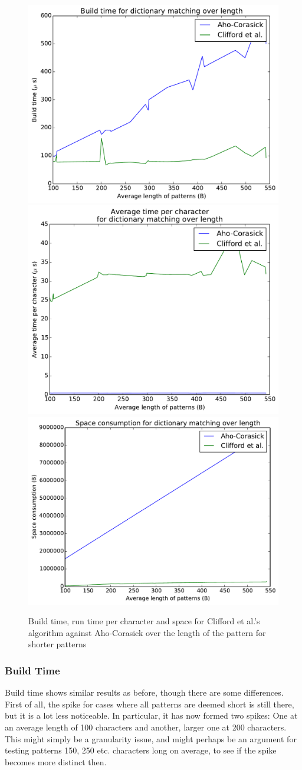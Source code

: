 \documentclass[ %
                    author={Dominic Joseph Moylett},
                    degree={MEng},
                     title={Dictionary Matching with Fingerprints},
                  subtitle={An Empirical Analysis},
                      type={research},
                      year={2015} ]{dissertation}
\begin{document}
\begin{figure}[t]
\begin{center}
  \includegraphics[width=0.5\linewidth]{build_length_200_1000}\\
  \includegraphics[width=0.5\linewidth]{time_length_200_1000}\includegraphics[width=0.5\linewidth]{size_length_200_1000}
\end{center}
\caption{Build time, run time per character and space for Clifford et al.'s algorithm against Aho-Corasick over the length of the pattern for shorter patterns}
\label{fig:short-pattern-results}
\end{figure}

\subsubsection{Build Time}

Build time shows similar results as before, though there are some differences. First of all, the spike for cases where all patterns are deemed short is still there, but it is a lot less noticeable. In particular, it has now formed two spikes: One at an average length of 100 characters and another, larger one at 200 characters. This might simply be a granularity issue, and might perhaps be an argument for testing patterns 150, 250 etc. characters long on average, to see if the spike becomes more distinct then.
\end{document}

